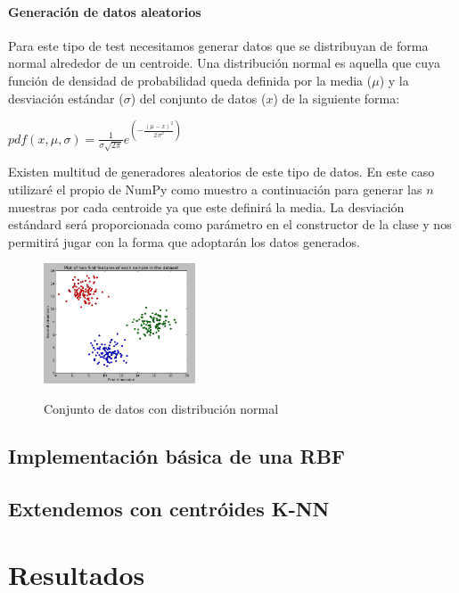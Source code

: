 \documentclass[10pt,a4paper]{report}
\begin{document}
\subsubsection{Generación de datos aleatorios}
Para este tipo de test necesitamos generar datos que se distribuyan de forma normal alrededor de un centroide. Una distribución normal es aquella que cuya función de densidad de probabilidad queda definida por la media ($\mu$) y la desviación estándar ($\sigma$) del conjunto de datos ($x$) de la siguiente forma:
\begin{center}
$pdf(x,\mu,\sigma) = \frac{1}{ \sigma \sqrt{2 \pi}} e^{\left(-\frac{{\left(\mu - x\right)}^{2}}{2 \, \sigma^{2}}\right)}$
\end{center} 
Existen multitud de generadores aleatorios de este tipo de datos. En este caso utilizaré el propio de NumPy como muestro a continuación para generar las $n$ muestras por cada centroide ya que este definirá la media. La desviación estándard será proporcionada como parámetro en el constructor de la clase y nos permitirá jugar con la forma que adoptarán los datos generados.

\begin{figure}[!h]{}
    \centering
    \includegraphics[width=0.4\textwidth]{img/clusteredData1.png}
    \label{fig:clusteredData1}
    \caption{Conjunto de datos con distribución normal}
\end{figure}
\section{Implementación básica de una RBF}

\section{Extendemos con centróides K-NN}

\chapter{Resultados}
\end{document}
